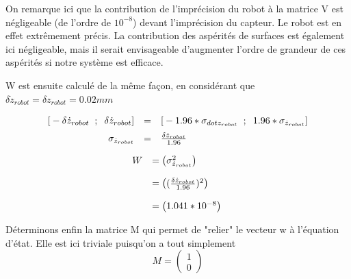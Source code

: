 \documentclass[12pt,twoside,a4paper]{article}
\begin{document}
On remarque ici que la contribution de l'imprécision du robot à la matrice V est négligeable (de l'ordre de $10^{-8}$) devant l'imprécision du capteur. Le robot est en effet extrêmement précis. La contribution des aspérités de surfaces est également ici négligeable, mais il serait envisageable d'augmenter l'ordre de grandeur de ces aspérités si notre système est efficace.  



\vspace{2cm}

W est ensuite calculé de la même façon, en considérant que $\delta \dot{z}_{robot} = \delta z_{robot} = 0.02mm$

$$
\begin{array}{rcl}
	\text{[} -\delta \dot{z}_{robot} \rule{2mm}{0pt}; \rule{2mm}{0pt} \delta \dot{z}_{robot} \text{]} &=& \text{[}-1.96*\sigma_{dot{z}_{robot}} \rule{2mm}{0pt}; \rule{2mm}{0pt} 1.96*\sigma_{\dot{z}_{robot}}  \text{]} \\
	\sigma_{\dot{z}_{robot}} &= & \frac{\delta\dot{z}_{robot}}{1.96} \rule{0pt}{15pt} \\
\end{array}
$$

$$
\begin{array}{ll}
W &=
\begin{pmatrix}
 \sigma_{\dot{z}_{robot}}^{2} 
\end{pmatrix} \\
&=
\begin{pmatrix}
(\frac{\delta\dot{z}_{robot}}{1.96})^{2}
\end{pmatrix} \rule{0pt}{20pt} \\ 
&= \begin{pmatrix} 1.041*10^{-8} \end{pmatrix} \rule{0pt}{20pt} \\ 
\end{array}
$$

\vspace{0.5cm}

Déterminons enfin la matrice M qui permet de "relier" le vecteur w à l'équation d'état. Elle est ici triviale puisqu'on a tout simplement 
$$
M = 
\begin{pmatrix}
1 \\ 0
\end{pmatrix}
$$


\vspace{0.5cm}
\end{document}
